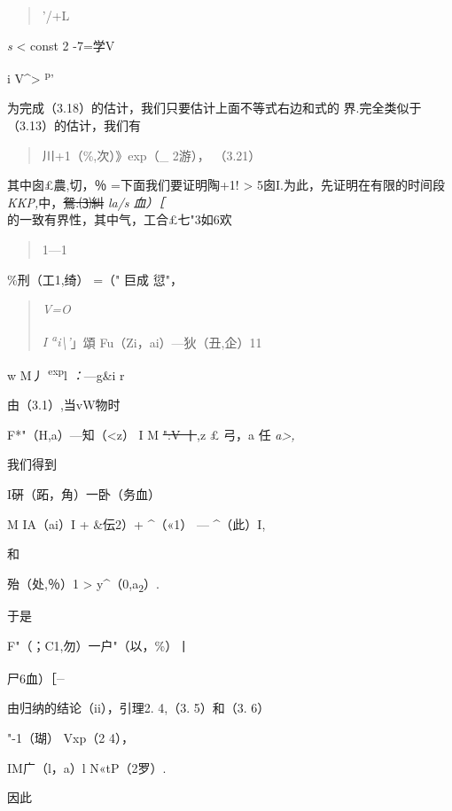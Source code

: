 \begin{quote}
'/+L
\end{quote}

\emph{s} \textless{} const 2 -7=学V

i V\^{}\textgreater{} \textsuperscript{p}'

为完成（3.18）的估计，我们只要估计上面不等式右边和式的
界.完全类似于（3.13）的估计，我们有

\begin{quote}
\textbar{}川+1（\%,次）\textbar{}》exp（\_ 2游）， （3.21）
\end{quote}

其中囱£農,切，％ =下面我们要证明陶+1! \textgreater{}
5囱I.为此，先证明在有限的时间段 \emph{KKP,}中，\sout{鴛:⑶糾} \emph{la/s
血）［\\
}的一致有界性，其中气，工合£七"3如6欢

\begin{quote}
1---1
\end{quote}

{\textbar{}\%刑（工1,绮）\textbar{}} =（" {巨成 愆"，}

\begin{quote}
\emph{V=O}

\emph{I \textsuperscript{a}i\textbackslash{}'}」頌
{\textbar{}Fu（Zi，ai）---狄（丑,企）1}1
\end{quote}

w M丿 \textsuperscript{exp}l \emph{：}---g\&i r

由（3.1）,当vW物时

\textbar{}F*"（H,a）---知（\textless{}z） I M \sout{":V 丨},z £ 弓，a 任
\emph{a\textgreater{},}

我们得到

I硏（跖，角）一卧（务血）\textbar{}

M IA（ai）I + \textbar{}\&伝2）+ \textbar{}\^{}（«1） --- \^{}（此）I,

和

\textbar{}殆（处,％）1 \textgreater{}
y\textbar{}\^{}（0,a\textsubscript{2}）\textbar{}.

于是

{\textbar{}F"（；C1,勿）一户"（以，\%）丨}

\textbar{}尸6血）［\textsuperscript{\_}

由归纳的结论（ii），引理2. 4,（3. 5）和（3. 6）

\textbar{}"-1（瑚）\textbar{} Vxp（2 4），

IM广（l，a）l N«tP（2罗）.

因此

